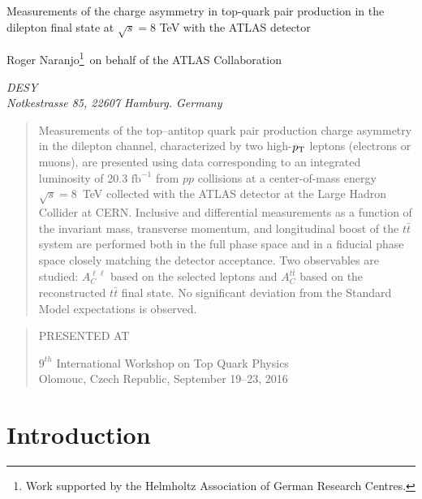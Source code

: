 \documentclass[12pt]{article}
\newcommand\pubnumber{}
\newcommand\pubdate{\today}
\def\institute{DESY\\
Notkestrasse 85, 22607 Hamburg. Germany}
\def\support{\footnote{Work supported by the Helmholtz Association of German Research Centres.}}
\def\Title#1{\begin{center} {\Large #1 } \end{center}}
\def\Author#1{\begin{center}{ \sc #1} \end{center}}
\def\Address#1{\begin{center}{ \it #1} \end{center}}
\newcommand\pubblock{\rightline{\begin{tabular}{l} \pubnumber\\
         \pubdate  \end{tabular}}}
\newenvironment{Abstract}{\begin{quotation}  }{\end{quotation}}
\newenvironment{Presented}{\begin{quotation} \begin{center} 
             PRESENTED AT\end{center}\bigskip 
      \begin{center}\begin{large}}{\end{large}\end{center} \end{quotation}}
\begin{document}
\begin{titlepage}
\pubblock

\vfill
\Title{Measurements of the charge asymmetry in top-quark pair production in the dilepton final state at $\sqrt{s}=8$ TeV with the ATLAS detector}
\vfill
\Author{ Roger Naranjo\support~on behalf of the ATLAS Collaboration}
\Address{\institute}
\vfill
\begin{Abstract}
 Measurements of the top--antitop quark pair production charge asymmetry
    in the dilepton channel, characterized by two high-${p}_{\rm{T}}$ leptons (electrons or
muons), are presented using data
    corresponding to an integrated luminosity of  20.3 $\textrm{fb}^{-1}$ from $pp$
    collisions at a center-of-mass energy $\sqrt{s} = 8$~TeV collected
    with the ATLAS detector at the Large Hadron Collider
    at CERN. Inclusive and differential measurements as a function of
    the invariant mass, transverse momentum, and longitudinal boost of
    the $t\bar{t}$  system
    are performed both in the full phase space and in a fiducial
    phase space closely matching the detector acceptance.
    Two observables are studied: $A_C^{\ell \ell}$ based on the selected leptons and $A_C^{t\bar{t}}$ based on the
    reconstructed $t\bar{t}$ final state. No significant deviation from the Standard Model expectations is observed.
\end{Abstract}
\vfill
\begin{Presented}
$9^{th}$ International Workshop on Top Quark Physics\\
Olomouc, Czech Republic,  September 19--23, 2016
\end{Presented}
\vfill
\end{titlepage}
\def\thefootnote{\fnsymbol{footnote}}
\setcounter{footnote}{0}
%

\section{Introduction}
\end{document}
